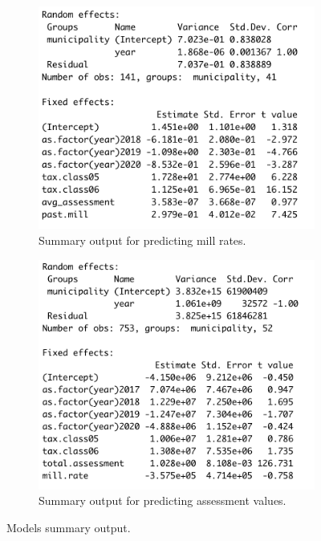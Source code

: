 \documentclass{article}
\begin{document}
\begin{figure}[ht]
\centering
\begin{subfigure}{.5\textwidth}
  \centering
  \includegraphics[width=.9\textwidth]{figures/lmemill.png}
  \caption{Summary output for predicting mill rates.}
  \label{fig:6a}
\end{subfigure}%
\begin{subfigure}{.5\textwidth}
  \centering
  \includegraphics[width=.9\textwidth]{figures/lmeas.png}
  \caption{Summary output for predicting assessment values.}
  \label{fig:6b}
\end{subfigure}
\caption{Models summary output.}
\label{fig:6}
\end{figure}
\end{document}
